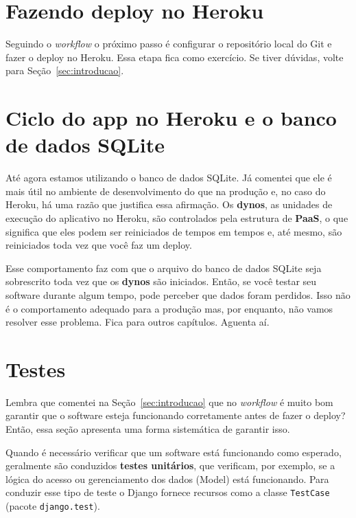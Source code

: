 \documentclass[brazil,a4paper,oneside,openright,parskip=full]{book}
\newcommand{\passthrough}[1]{#1}
\begin{document}
\hypertarget{fazendo-deploy-no-heroku}{%
\section{Fazendo deploy no Heroku}\label{fazendo-deploy-no-heroku}}

Seguindo o \emph{workflow} o próximo passo é configurar o repositório
local do Git e fazer o deploy no Heroku. Essa etapa fica como exercício.
Se tiver dúvidas, volte para Seção~\ref{sec:introducao}.

\hypertarget{ciclo-do-app-no-heroku-e-o-banco-de-dados-sqlite}{%
\section{Ciclo do app no Heroku e o banco de dados
SQLite}\label{ciclo-do-app-no-heroku-e-o-banco-de-dados-sqlite}}

Até agora estamos utilizando o banco de dados SQLite. Já comentei que
ele é mais útil no ambiente de desenvolvimento do que na produção e, no
caso do Heroku, há uma razão que justifica essa afirmação. Os
\textbf{dynos}, as unidades de execução do aplicativo no Heroku, são
controlados pela estrutura de \textbf{PaaS}, o que significa que eles
podem ser reiniciados de tempos em tempos e, até mesmo, são reiniciados
toda vez que você faz um deploy.

Esse comportamento faz com que o arquivo do banco de dados SQLite seja
sobrescrito toda vez que os \textbf{dynos} são iniciados. Então, se você
testar seu software durante algum tempo, pode perceber que dados foram
perdidos. Isso não é o comportamento adequado para a produção mas, por
enquanto, não vamos resolver esse problema. Fica para outros capítulos.
Aguenta aí.

\hypertarget{testes}{%
\section{Testes}\label{testes}}

Lembra que comentei na Seção~\ref{sec:introducao} que no \emph{workflow}
é muito bom garantir que o software esteja funcionando corretamente
antes de fazer o deploy? Então, essa seção apresenta uma forma
sistemática de garantir isso.

Quando é necessário verificar que um software está funcionando como
esperado, geralmente são conduzidos \textbf{testes unitários}, que
verificam, por exemplo, se a lógica do acesso ou gerenciamento dos dados
(Model) está funcionando. Para conduzir esse tipo de teste o Django
fornece recursos como a classe \passthrough{\lstinline!TestCase!}
(pacote \passthrough{\lstinline!django.test!}).
\end{document}
